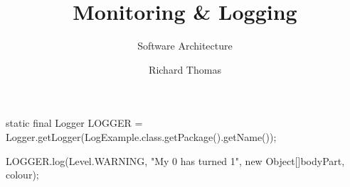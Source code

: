 \documentclass{slide}
\title{Monitoring \& Logging}
\subtitle{Software Architecture}
\author{Richard Thomas}
\date{\week{9}}
\begin{document}
\maketitle


\begin{code}[language=java]{}
static final Logger LOGGER =
        Logger.getLogger(LogExample.class.getPackage().getName());

LOGGER.log(Level.WARNING, "My {0} has turned {1}",
            new Object[]{bodyPart, colour});
\end{code}

\end{document}
